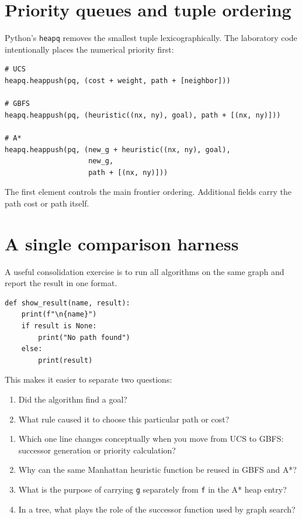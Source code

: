 \section{Priority queues and tuple ordering}

Python's \texttt{heapq} removes the smallest tuple lexicographically. The laboratory code intentionally places the numerical priority first:

\begin{lstlisting}[style=mlpython]
# UCS
heapq.heappush(pq, (cost + weight, path + [neighbor]))

# GBFS
heapq.heappush(pq, (heuristic((nx, ny), goal), path + [(nx, ny)]))

# A*
heapq.heappush(pq, (new_g + heuristic((nx, ny), goal),
                    new_g,
                    path + [(nx, ny)]))
\end{lstlisting}

The first element controls the main frontier ordering. Additional fields carry the path cost or path itself.

\section{A single comparison harness}

A useful consolidation exercise is to run all algorithms on the same graph and report the result in one format.

\begin{lstlisting}[style=mlpython]
def show_result(name, result):
    print(f"\n{name}")
    if result is None:
        print("No path found")
    else:
        print(result)
\end{lstlisting}

This makes it easier to separate two questions:
\begin{enumerate}
  \item Did the algorithm find a goal?
  \item What rule caused it to choose this particular path or cost?
\end{enumerate}



\begin{quickcheck}
\begin{enumerate}
  \item Which one line changes conceptually when you move from UCS to GBFS: successor generation or priority calculation?
  \item Why can the same Manhattan heuristic function be reused in GBFS and A*?
  \item What is the purpose of carrying \texttt{g} separately from \texttt{f} in the A* heap entry?
  \item In a tree, what plays the role of the successor function used by graph search?
\end{enumerate}
\end{quickcheck}


